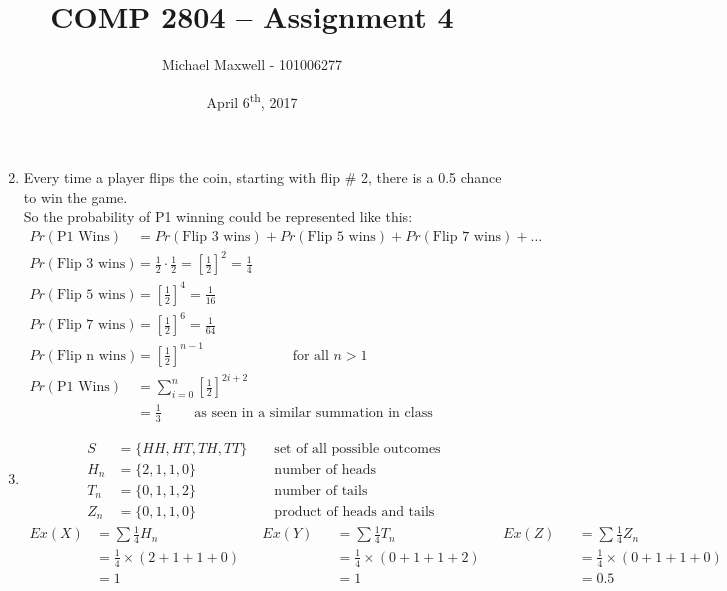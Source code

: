 \documentclass{article}
\title{COMP 2804 -- Assignment 4}
\author{Michael Maxwell - 101006277}
\date{April 6\textsuperscript{th}, 2017}
\begin{document}
	\maketitle

	\begin{enumerate}
		\setcounter{enumi}{1}
		\item %
		Every time a player flips the coin, starting with flip \# 2, there is a 0.5 chance to win the game. \\
		So the probability of P1 winning could be represented like this:
		\begin{align*}
			Pr(\text{P1 Wins}) &= Pr(\text{Flip 3 wins}) + Pr(\text{Flip 5 wins}) + Pr(\text{Flip 7 wins}) + \ldots \\
			Pr(\text{Flip 3 wins})&= \frac{1}{2} \cdot \frac{1}{2} = \left[\frac{1}{2}\right]^2 = \frac{1}{4} \\
			Pr(\text{Flip 5 wins})&= \left[\frac{1}{2}\right]^4 = \frac{1}{16} \\
			Pr(\text{Flip 7 wins})&= \left[\frac{1}{2}\right]^6 = \frac{1}{64} \\
			Pr(\text{Flip n wins}) &= \left[\frac{1}{2}\right]^{n - 1} \qquad \qquad  \qquad \text{ for all } n > 1 \\
			Pr(\text{P1 Wins}) &= \sum_{i = 0}^{n} \left[\frac{1}{2}\right]^{2i + 2} \\
			&= \frac{1}{3} \qquad \text{ as seen in a similar summation in class}
		\end{align*}
		\item %
			\begin{align*}
			S &= \{HH, HT, TH, TT\} && \text{ set of all possible outcomes}
			\\
			H_n &= \{2, 1, 1, 0\} && \text{ number of heads }
			\\
			T_n &= \{0, 1, 1, 2\} && \text{ number of tails }
			\\
			Z_n &= \{0, 1, 1, 0\} && \text{ product of heads and tails }
			\end{align*}
			\begin{align*}
				Ex(X) &= \sum \frac{1}{4} H_n  && Ex(Y) &&= \sum \frac{1}{4} T_n  && Ex(Z) &&= \sum \frac{1}{4} Z_n \\
				&= \frac{1}{4} \times (2 + 1 + 1 + 0) &&&&= \frac{1}{4} \times (0 + 1 + 1 + 2) &&&&= \frac{1}{4} \times (0 + 1 + 1 + 0) \\
				&= 1 &&&&= 1 &&&&= 0.5
			\end{align*}
			\begin{align*}

\end{align*}
\end{enumerate}
\end{document}
